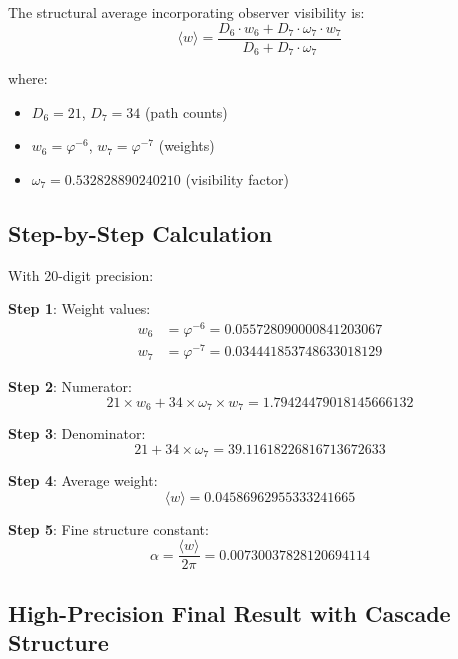 \documentclass[%
 reprint,
 amsmath,amssymb,
 aps,
 prd,
 10pt,
 nofootinbib,      %
 longbibliography  %
]{revtex4-2}
\theoremstyle{definition}
\theoremstyle{remark}
\begin{document}
The structural average incorporating observer visibility is:
\begin{equation}
\langle w \rangle = \frac{D_6 \cdot w_6 + D_7 \cdot \omega_7 \cdot w_7}{D_6 + D_7 \cdot \omega_7}
\end{equation}

where:
\begin{itemize}
\item $D_6 = 21$, $D_7 = 34$ (path counts)
\item $w_6 = \varphi^{-6}$, $w_7 = \varphi^{-7}$ (weights)
\item $\omega_7 = 0.532828890240210$ (visibility factor)
\end{itemize}

\subsection{Step-by-Step Calculation}

With 20-digit precision:

\textbf{Step 1}: Weight values:
\begin{align}
w_6 &= \varphi^{-6} = 0.055728090000841203067 \\
w_7 &= \varphi^{-7} = 0.034441853748633018129
\end{align}

\textbf{Step 2}: Numerator:
\begin{equation}
21 \times w_6 + 34 \times \omega_7 \times w_7 = 1.79424479018145666132
\end{equation}

\textbf{Step 3}: Denominator:
\begin{equation}
21 + 34 \times \omega_7 = 39.11618226816713672633
\end{equation}

\textbf{Step 4}: Average weight:
\begin{equation}
\langle w \rangle = 0.04586962955333241665
\end{equation}

\textbf{Step 5}: Fine structure constant:
\begin{equation}
\alpha = \frac{\langle w \rangle}{2\pi} = 0.00730037828120694114
\end{equation}

\subsection{High-Precision Final Result with Cascade Structure}
\end{document}
